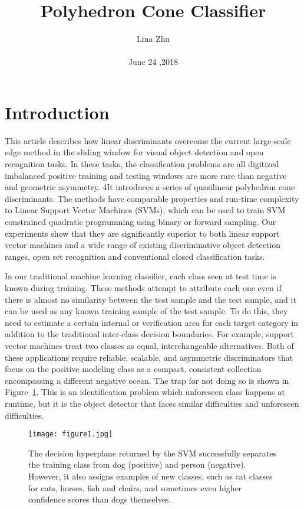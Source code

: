 \documentclass[10pt,twocolumn,letterpaper]{article}
\begin{document}
	\title{Polyhedron Cone Classifier}
	\author{Lina Zhu\\\\June 24  ,2018}
\maketitle
\section{Introduction}
 This article describes how linear discriminants overcome the current large-scale edge method in the sliding window for visual object detection and open recognition tasks. In these tasks, the classification problems are all digitized imbalanced positive training and testing windows are more rare than negative and geometric asymmetry. 4It introduces a series of quasilinear polyhedron cone discriminants. The methods have comparable properties and run-time complexity to Linear Support Vector Machines (SVMs), which can be used to train SVM constrained quadratic programming using binary or forward sampling. Our experiments show that they are significantly superior to both linear support vector machines and a wide range of existing discriminative object detection ranges, open set recognition and conventional closed classification tasks.

\par In our traditional machine learning classifier, each class seen at test time is known during training. These methods attempt to attribute each one even if there is almost no similarity between the test sample and the test sample, and it can be used as any known training sample of the test sample. To do this, they need to estimate a certain internal or verification area for each target category in addition to the traditional inter-class decision boundaries. For example, support vector machines treat two classes as equal, interchangeable alternatives. Both of these applications require reliable, scalable, and asymmetric discriminators that focus on the positive modeling class as a compact, consistent collection encompassing a different negative ocean. The trap for not doing so is shown in Figure~\ref{pic1}. This is an identification problem which unforeseen class happens at runtime, but it is the object detector that faces similar difficulties and unforeseen difficulties.
\begin{figure}[htp]
	\centering
	\texttt{[image: figure1.jpg]}
	\caption{ The decision hyperplane returned by the SVM successfully separates the training class from dog (positive) and person (negative). However, it also assigns examples of new classes, such as cat classes for cats, horses, fish and chairs, and sometimes even higher confidence scores than dogs themselves.
	}\label{pic1}
\end{figure}
\end{document}
